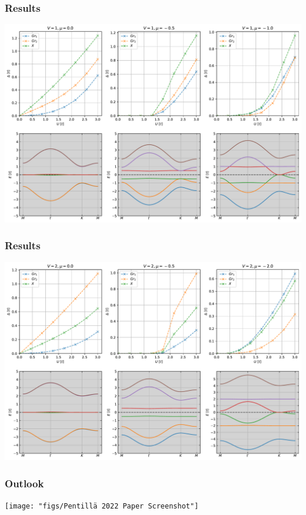 \documentclass[aspectratio=169]{beamer}
\begin{document}
\begin{frame}[t]
	\frametitle{Results}
	
	\begin{center}
		\includegraphics[width=0.65\linewidth]{figs/gap_size_vs_U_egx_uniform_U_V_1}
	\end{center}
\end{frame}

\begin{frame}[t]
	\frametitle{Results}
	
	\begin{center}
		\includegraphics[width=0.65\linewidth]{figs/gap_size_vs_U_egx_uniform_U_V_2}
	\end{center}
\end{frame}


	

\begin{frame}
	\frametitle{Outlook}
	
	\begin{center}
		\texttt{[image: "figs/Pentillä 2022 Paper Screenshot"]}
	\end{center}
\end{frame}
\end{document}
